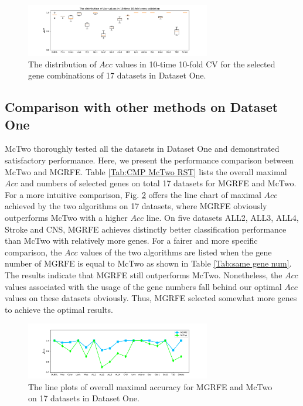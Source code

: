 \documentclass[10pt,journal,compsoc]{IEEEtran}
\begin{document}
	\begin{figure}[htbp]
		\centering
		\includegraphics[width=0.72\textwidth]{pictures/CV1.pdf}
		\caption{The distribution of $Acc$ values in 10-time 10-fold CV for the selected gene combinations of 17 datasets in Dataset One.}
		\label{Fig:CV1}
	\end{figure}
	
	\subsection{Comparison with other methods on Dataset One}
	
	McTwo \cite{W16} thoroughly tested all the datasets in Dataset One and demonstrated satisfactory performance. Here, we present the performance comparison between McTwo and MGRFE. Table \ref{Tab:CMP McTwo RST} lists the overall maximal \(Acc\) and numbers of selected genes on total 17 datasets for MGRFE and McTwo. For a more intuitive comparison, Fig. \ref{Fig:CMP McTwo} offers the line chart of maximal \(Acc\) achieved by the two algorithms on 17 datasets, where MGRFE obviously outperforms McTwo with a higher \(Acc\) line. On five datasets ALL2, ALL3, ALL4, Stroke and CNS, MGRFE achieves distinctly better classification performance than McTwo with relatively more genes. For a fairer and more specific comparison, the \(Acc\) values of the two algorithms are listed when the gene number of MGRFE is equal to McTwo as shown in Table \ref{Tab:same gene num}. The results indicate that MGRFE still outperforms McTwo. Nonetheless, the \(Acc\) values associated with the usage of the gene numbers fall behind our optimal \(Acc\) values on these datasets obviously. Thus, MGRFE selected somewhat more genes to achieve the optimal results.
	
	\begin{figure}[ht]
		\centering
		\includegraphics[width=0.72\textwidth]{pictures/CMP-McTwo.pdf}
		\caption{The line plots of overall maximal accuracy for MGRFE and McTwo on 17 datasets in Dataset One.}
		\label{Fig:CMP McTwo}
	\end{figure}
	
\end{document}
